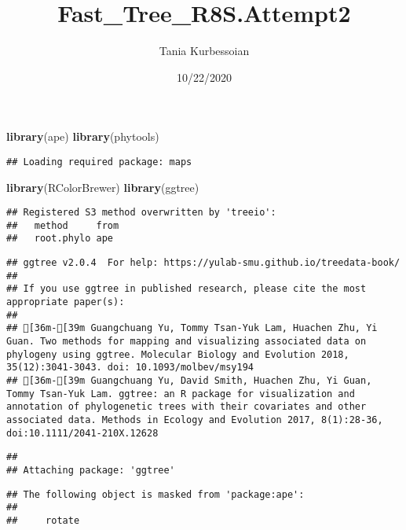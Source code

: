\documentclass[
]{article}
\title{Fast\_Tree\_R8S.Attempt2}
\author{Tania Kurbessoian}
\date{10/22/2020}
\newenvironment{Shaded}{\begin{snugshade}}{\end{snugshade}}
\newcommand{\KeywordTok}[1]{\textcolor[rgb]{0.13,0.29,0.53}{\textbf{#1}}}
\newcommand{\NormalTok}[1]{#1}
\begin{document}
\maketitle

\begin{Shaded}
\begin{Highlighting}[]
\KeywordTok{library}\NormalTok{(ape)}
\KeywordTok{library}\NormalTok{(phytools)}
\end{Highlighting}
\end{Shaded}

\begin{verbatim}
## Loading required package: maps
\end{verbatim}

\begin{Shaded}
\begin{Highlighting}[]
\KeywordTok{library}\NormalTok{(RColorBrewer)}
\KeywordTok{library}\NormalTok{(ggtree)}
\end{Highlighting}
\end{Shaded}

\begin{verbatim}
## Registered S3 method overwritten by 'treeio':
##   method     from
##   root.phylo ape
\end{verbatim}

\begin{verbatim}
## ggtree v2.0.4  For help: https://yulab-smu.github.io/treedata-book/
## 
## If you use ggtree in published research, please cite the most appropriate paper(s):
## 
## [36m-[39m Guangchuang Yu, Tommy Tsan-Yuk Lam, Huachen Zhu, Yi Guan. Two methods for mapping and visualizing associated data on phylogeny using ggtree. Molecular Biology and Evolution 2018, 35(12):3041-3043. doi: 10.1093/molbev/msy194
## [36m-[39m Guangchuang Yu, David Smith, Huachen Zhu, Yi Guan, Tommy Tsan-Yuk Lam. ggtree: an R package for visualization and annotation of phylogenetic trees with their covariates and other associated data. Methods in Ecology and Evolution 2017, 8(1):28-36, doi:10.1111/2041-210X.12628
\end{verbatim}

\begin{verbatim}
## 
## Attaching package: 'ggtree'
\end{verbatim}

\begin{verbatim}
## The following object is masked from 'package:ape':
## 
##     rotate
\end{verbatim}
\end{document}

